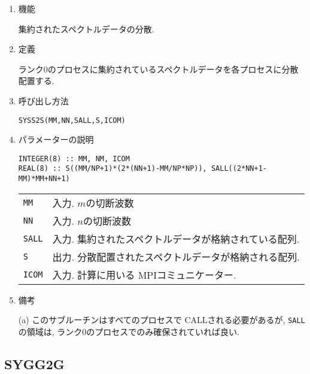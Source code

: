 \documentclass[a4j]{jsarticle}
\begin{document}
\begin{enumerate}

\item 機能 

集約されたスペクトルデータの分散.

\item 定義

ランク0のプロセスに集約されているスペクトルデータを各プロセスに分散配置する.

\item 呼び出し方法 

\texttt{SYSS2S(MM,NN,SALL,S,ICOM)}
  
\item パラメーターの説明

\begin{verbatim}        
INTEGER(8) :: MM, NM, ICOM
REAL(8) :: S((MM/NP+1)*(2*(NN+1)-MM/NP*NP)), SALL((2*NN+1-MM)*MM+NN+1)
\end{verbatim}      
  

\begin{tabular}{ll}
\texttt{MM} & 入力. $m$の切断波数\\
\texttt{NN} & 入力. $n$の切断波数\\
\texttt{SALL} 
 &  入力. 集約されたスペクトルデータが格納されている配列.\\
\texttt{S} 
&  出力. 分散配置されたスペクトルデータが格納される配列.\\
\texttt{ICOM} & 入力. 計算に用いる MPIコミュニケーター.
\end{tabular}

\item 備考

(a) このサブルーチンはすべてのプロセスで CALLされる必要があるが,
\texttt{SALL}の領域は, ランク0のプロセスでのみ確保されていれば良い.

\end{enumerate}


\subsection{SYGG2G}
\end{document}
